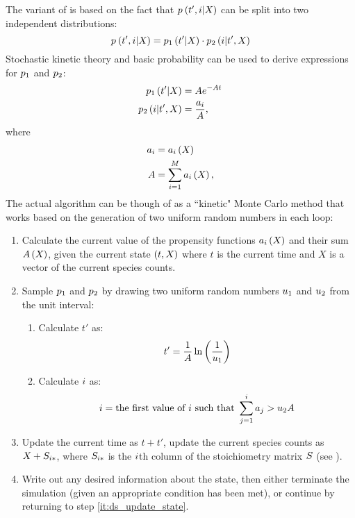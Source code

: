 The  variant of  is based on the fact that $p_{} \left( t', i | X_{} \right)$ can be split into two independent distributions:
\begin{equation*}
    p_{} \left( t', i | X_{} \right) = p_{1} \left( t' | X_{} \right) \cdot p_{2} \left( i | t', X_{} \right)
\end{equation*}
Stochastic kinetic theory and basic probability can be used to derive expressions\cite{Gillespie:1976bj} for $p_{1}$ and $p_{2}$:
\begin{align}\label{eq:ds_probs}
    \begin{split}
        p_{1} \left( t' | X_{} \right) &= A e^{-A t} \\
        p_{2} \left( i | t', X_{} \right) &= \frac{a_{i}}{A},
    \end{split}
\end{align}
where
\begin{align*}
    \begin{split}
        a_{i} &= a_{i} \left( X_{} \right) \\
        A &= \sum_{i=1}^{M}a_{i} \left( X_{} \right),
    \end{split}
\end{align*}
The actual  algorithm can be though of as a ``kinetic" Monte Carlo method\cite{Gillespie:2007bx} that works based on the generation of two uniform random numbers in each loop:
\begin{enumerate}
    \item\label{it:ds_update_state} Calculate the current value of the propensity functions $a_{i} \left( X_{} \right)$ and their sum $A \left( X_{} \right)$, given the current state $\left( t, X_{} \right)$ where $t$ is the current time and $X$ is a vector of the current species counts.
    \item Sample $p_{1}$ and $p_{2}$ by drawing two uniform random numbers $u_{1}$ and $u_{2}$ from the unit interval:
    \begin{enumerate}
        \item Calculate $t'$ as:
        \begin{equation*}
            t' = \frac{1}{A} \ln \left( \frac{1}{u_{1}} \right)
        \end{equation*}
        \item Calculate $i$ as:
        \begin{equation*}
            i = \textrm{the first value of $i$ such that } \sum_{j=1}^{i} a_{j} > u_{2} A
        \end{equation*} 
    \end{enumerate}
    \item Update the current time as $t + t'$, update the current species counts as $X_{} + S_{i *}$, where $S_{i *}$ is the $i$th column of the stoichiometry matrix $S$ (see ).
    \item Write out any desired information about the state, then either terminate the simulation (given an appropriate condition has been met), or continue by returning to step \ref{it:ds_update_state}.
\end{enumerate}

